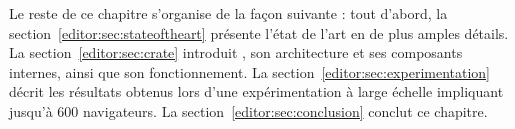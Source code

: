 Le reste de ce chapitre s'organise de la façon suivante : tout d'abord, la
section~\ref{editor:sec:stateoftheart} présente l'état de l'art en de plus
amples détails. La section~\ref{editor:sec:crate} introduit \CRATE, son
architecture et ses composants internes, ainsi que son fonctionnement. La
section~\ref{editor:sec:experimentation} décrit les résultats obtenus lors d'une
expérimentation à large échelle impliquant jusqu'à 600 navigateurs. La
section~\ref{editor:sec:conclusion} conclut ce chapitre.


